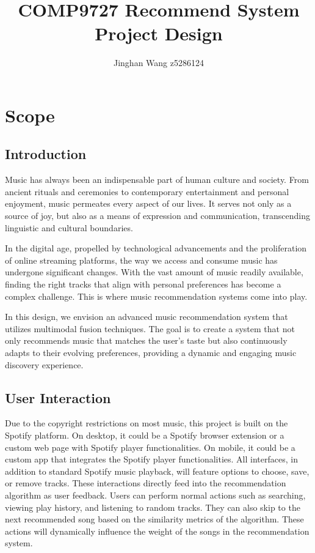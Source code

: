\documentclass[9pt,twocolumn,twoside,lineno]{gsajnl}
\title{COMP9727 Recommend System Project Design}
\author[1]{Jinghan Wang  z5286124}
\begin{document}
\maketitle
\thispagestyle{firststyle}
\vspace{-13pt}%

\section{Scope}
\subsection{Introduction}
Music has always been an indispensable part of human culture and society. From ancient rituals and ceremonies to contemporary entertainment and personal enjoyment, music permeates every aspect of our lives. It serves not only as a source of joy, but also as a means of expression and communication, transcending linguistic and cultural boundaries. 

In the digital age, propelled by technological advancements and the proliferation of online streaming platforms, the way we access and consume music has undergone significant changes. With the vast amount of music readily available, finding the right tracks that align with personal preferences has become a complex challenge. This is where music recommendation systems come into play. 

In this design, we envision an advanced music recommendation system that utilizes multimodal fusion techniques. The goal is to create a system that not only recommends music that matches the user’s taste but also continuously adapts to their evolving preferences, providing a dynamic and engaging music discovery experience.

\subsection{User Interaction}
Due to the copyright restrictions on most music, this project is built on the Spotify platform. On desktop, it could be a Spotify browser extension or a custom web page with Spotify player functionalities. On mobile, it could be a custom app that integrates the Spotify player functionalities. All interfaces, in addition to standard Spotify music playback, will feature options to choose, save, or remove tracks. These interactions directly feed into the recommendation algorithm as user feedback. Users can perform normal actions such as searching, viewing play history, and listening to random tracks. They can also skip to the next recommended song based on the similarity metrics of the algorithm. These actions will dynamically influence the weight of the songs in the recommendation system.
\end{document}
